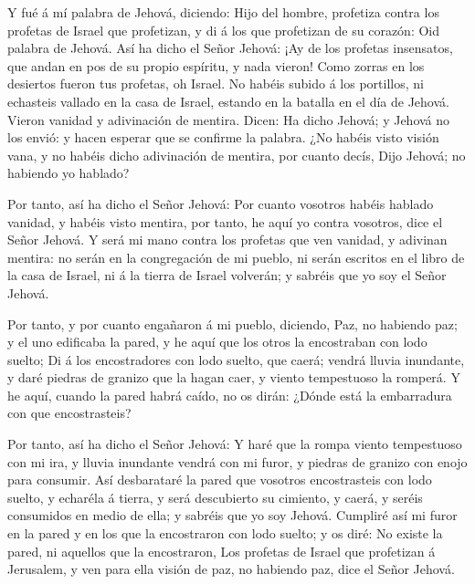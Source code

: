  Y fué á mí palabra de Jehová, diciendo: 
Hijo del hombre, profetiza contra los profetas de Israel que profetizan,
y di á los que profetizan de su corazón: Oid palabra de Jehová.
 Así ha dicho el Señor Jehová: ¡Ay de los profetas
insensatos, que andan en pos de su propio espíritu, y nada vieron!
 Como zorras en los desiertos fueron tus profetas, oh
Israel.  No habéis subido á los portillos, ni echasteis
vallado en la casa de Israel, estando en la batalla en el día de Jehová.
 Vieron vanidad y adivinación de mentira. Dicen: Ha dicho
Jehová; y Jehová no los envió: y hacen esperar que se confirme la
palabra.  ¿No habéis visto visión vana, y no habéis dicho
adivinación de mentira, por cuanto decís, Dijo Jehová; no habiendo yo
hablado?

 Por tanto, así ha dicho el Señor Jehová: Por cuanto
vosotros habéis hablado vanidad, y habéis visto mentira, por tanto, he
aquí yo contra vosotros, dice el Señor Jehová.  Y será mi
mano contra los profetas que ven vanidad, y adivinan mentira: no serán
en la congregación de mi pueblo, ni serán escritos en el libro de la
casa de Israel, ni á la tierra de Israel volverán; y sabréis que yo soy
el Señor Jehová.

 Por tanto, y por cuanto engañaron á mi pueblo, diciendo,
Paz, no habiendo paz; y el uno edificaba la pared, y he aquí que los
otros la encostraban con lodo suelto;  Di á los
encostradores con lodo suelto, que caerá; vendrá lluvia inundante, y
daré piedras de granizo que la hagan caer, y viento tempestuoso la
romperá.  Y he aquí, cuando la pared habrá caído, no os
dirán: ¿Dónde está la embarradura con que encostrasteis?

 Por tanto, así ha dicho el Señor Jehová: Y haré que la
rompa viento tempestuoso con mi ira, y lluvia inundante vendrá con mi
furor, y piedras de granizo con enojo para consumir.  Así
desbarataré la pared que vosotros encostrasteis con lodo suelto, y
echaréla á tierra, y será descubierto su cimiento, y caerá, y seréis
consumidos en medio de ella; y sabréis que yo soy Jehová.
 Cumpliré así mi furor en la pared y en los que la
encostraron con lodo suelto; y os diré: No existe la pared, ni aquellos
que la encostraron,  Los profetas de Israel que
profetizan á Jerusalem, y ven para ella visión de paz, no habiendo paz,
dice el Señor Jehová.

